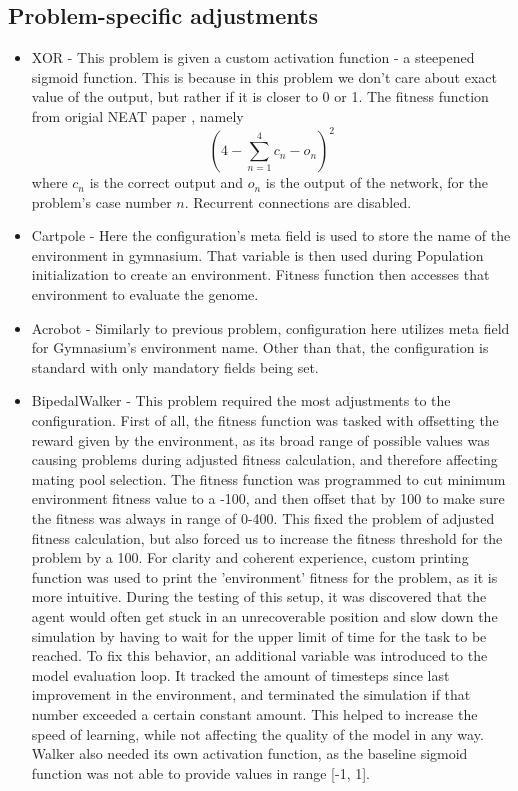 \documentclass{article}
\begin{document}
        \subsection{Problem-specific adjustments}
        \begin{itemize}
            \item XOR - This problem is given a custom activation function - a steepened sigmoid function.
            This is because in this problem we don't care about exact value of the output, but rather if it is closer to 0 or 1.
            The fitness function from origial NEAT paper \cite{originalNeat}, namely $$(4 - \sum_{n=1}^{4}c_n-o_n)^2$$
            where $c_n$ is the correct output and $o_n$ is the output of the network, for the problem's case number $n$.
            Recurrent connections are disabled.
            \item Cartpole - Here the configuration's meta field is used to store the name of the environment in gymnasium. That 
            variable is then used during Population initialization to create an environment. Fitness function then accesses that 
            environment to evaluate the genome.  
            \item Acrobot - Similarly to previous problem, configuration here utilizes meta field for Gymnasium's environment name. 
            Other than that, the configuration is standard with only mandatory fields being set.
            \item BipedalWalker - This problem required the most adjustments to the configuration. First of all, the fitness function 
            was tasked with offsetting the reward given by the environment, as its broad range of possible values was causing
            problems during adjusted fitness calculation, and therefore affecting mating pool selection. The fitness function was 
            programmed to cut minimum environment fitness value to a -100, and then offset that by 100 to make sure the fitness was always in range
            of 0-400. This fixed the problem of adjusted fitness calculation, but also forced us to increase the fitness threshold 
            for the problem by a 100. For clarity and coherent experience, custom printing function was used to print the 'environment' fitness
            for the problem, as it is more intuitive. During the testing of this setup, it was discovered that 
            the agent would often get stuck in an unrecoverable position and slow down the simulation by having to wait for the upper limit of time
            for the task to be reached. To fix this behavior, an additional variable was introduced to the model evaluation loop. It
            tracked the amount of timesteps since last improvement in the environment, and terminated the simulation if that number exceeded 
            a certain constant amount. This helped to increase the speed of learning, while not affecting the quality of the model in any way.
            Walker also needed its own activation function, as the baseline sigmoid function was not able to provide values in range [-1, 1].
            \end{itemize}
\end{document}
